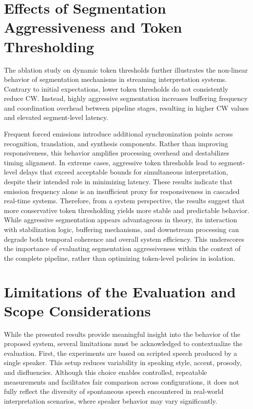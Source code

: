 \section{Effects of Segmentation Aggressiveness and Token Thresholding}

The ablation study on dynamic token thresholds further illustrates the non-linear behavior of segmentation mechanisms in streaming interpretation systems. Contrary to initial expectations, lower token thresholds do not consistently reduce CW. Instead, highly aggressive segmentation increases buffering frequency and coordination overhead between pipeline stages, resulting in higher CW values and elevated segment-level latency.

Frequent forced emissions introduce additional synchronization points across recognition, translation, and synthesis components. Rather than improving responsiveness, this behavior amplifies processing overhead and destabilizes timing alignment. In extreme cases, aggressive token thresholds lead to segment-level delays that exceed acceptable bounds for simultaneous interpretation, despite their intended role in minimizing latency. These results indicate that emission frequency alone is an insufficient proxy for responsiveness in cascaded real-time systems. Therefore, from a system perspective, the results suggest that more conservative token thresholding yields more stable and predictable behavior. While aggressive segmentation appears advantageous in theory, its interaction with stabilization logic, buffering mechanisms, and downstream processing can degrade both temporal coherence and overall system efficiency. This underscores the importance of evaluating segmentation aggressiveness within the context of the complete pipeline, rather than optimizing token-level policies in isolation.

\section{Limitations of the Evaluation and Scope Considerations}

While the presented results provide meaningful insight into the behavior of the proposed system, several limitations must be acknowledged to contextualize the evaluation. First, the experiments are based on scripted speech produced by a single speaker. This setup reduces variability in speaking style, accent, prosody, and disfluencies. Although this choice enables controlled, repeatable measurements and facilitates fair comparison across configurations, it does not fully reflect the diversity of spontaneous speech encountered in real-world interpretation scenarios, where speaker behavior may vary significantly.

